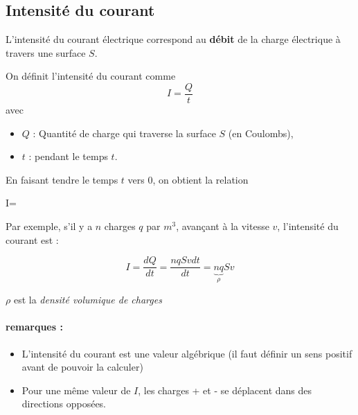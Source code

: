 \documentclass{cours}
\begin{document}
\subsection{Intensité du courant}
L'intensité du courant électrique correspond au \textbf{débit} de la charge électrique à travers une surface $S$.
\begin{center}
\end{center}
On définit l'intensité du courant comme 
\begin{equation*}
I=\frac{Q}{t}
\end{equation*}
avec
\begin{itemize}
\item $Q$ : Quantité de charge qui traverse la surface $S$ (en Coulombs),
\item $t$ : pendant le temps $t$.
\end{itemize}

En faisant tendre le temps $t$ vers 0, on obtient la relation 
\begin{eqencadre}
I=
\end{eqencadre}

Par exemple, s'il y a $n$ charges $q$ par $\si{m^3}$, avançant à la vitesse $v$, l'intensité du courant est : 

\begin{equation*}
  I=\frac{dQ}{dt} = \frac{nqSvdt}{dt} = \underbrace{nq}_{\rho}Sv
\end{equation*}

$\rho$ est la \emph{densité volumique de charges}

\paragraph{remarques :}
\begin{itemize}
\item L'intensité du courant est une valeur algébrique (il faut définir un sens positif avant de pouvoir la calculer)
\item Pour une même valeur de $I$, les charges + et - se déplacent dans des directions opposées.
\end{itemize}
\end{document}
